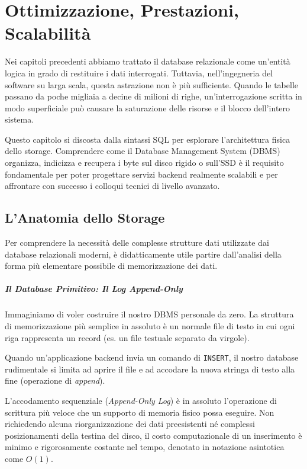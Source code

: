 \chapter{Ottimizzazione, Prestazioni, Scalabilità}

Nei capitoli precedenti abbiamo trattato il database relazionale come un'entità logica in grado di restituire i dati interrogati. Tuttavia, nell'ingegneria del software su larga scala, questa astrazione non è più sufficiente. Quando le tabelle passano da poche migliaia a decine di milioni di righe, un'interrogazione scritta in modo superficiale può causare la saturazione delle risorse e il blocco dell'intero sistema.

Questo capitolo si discosta dalla sintassi SQL per esplorare l'architettura fisica dello storage. Comprendere come il Database Management System (DBMS) organizza, indicizza e recupera i byte sul disco rigido o sull'SSD è il requisito fondamentale per poter progettare servizi backend realmente scalabili e per affrontare con successo i colloqui tecnici di livello avanzato.

\section{L'Anatomia dello Storage}

Per comprendere la necessità delle complesse strutture dati utilizzate dai database relazionali moderni, è didatticamente utile partire dall'analisi della forma più elementare possibile di memorizzazione dei dati.

\paragraph{Il Database Primitivo: Il Log Append-Only}

Immaginiamo di voler costruire il nostro DBMS personale da zero. La struttura di memorizzazione più semplice in assoluto è un normale file di testo in cui ogni riga rappresenta un record (es. un file testuale separato da virgole). 

Quando un'applicazione backend invia un comando di \texttt{INSERT}, il nostro database rudimentale si limita ad aprire il file e ad accodare la nuova stringa di testo alla fine (operazione di \textit{append}).

L'accodamento sequenziale (\textit{Append-Only Log}) è in assoluto l'operazione di scrittura più veloce che un supporto di memoria fisico possa eseguire. Non richiedendo alcuna riorganizzazione dei dati preesistenti né complessi posizionamenti della testina del disco, il costo computazionale di un inserimento è minimo e rigorosamente costante nel tempo, denotato in notazione asintotica come $O(1)$.

